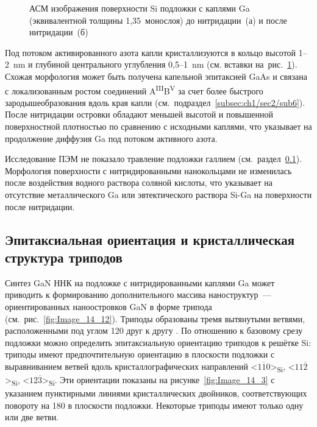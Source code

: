 \begin{figure}[ht] 
				\caption{АСМ изображения поверхности Si подложки с каплями Ga
			(эквивалентной толщины 1,35~монослоя) до нитридации~(а) и после
	нитридации~(б)}\label{fig:Image_13} \end{figure}

Под потоком активированного азота капли кристаллизуются в кольцо высотой
1--2~\si{\nano\meter} и глубиной центрального углубления
0,5--1~\si{\nano\meter} (см. вставки на~рис.~\cref{fig:Image_13}). Схожая
морфология может быть получена капельной эпитаксией GaAs \cite{Zhou2013} и
связана с локализованным ростом соединений
A\textsuperscript{III}B\textsuperscript{V} за счет более быстрого
зародышеобразования вдоль края капли
(см.~подраздел~\cref{subsec:ch1/sec2/sub6}). После нитридации островки обладают
меньшей высотой и повышенной поверхностной плотностью по сравнению с исходными
каплями, что указывает на продолжение диффузия Ga под потоком активного азота.

Исследование ПЭМ не показало травление подложки галлием
(см.~раздел~\cref{subsec:ch3/sec2/sub2}). Морфология поверхности с
нитридированными нанокольцами не изменилась после воздействия водного
раствора соляной кислоты, что указывает на отсутствие металлического Ga или
эвтектического раствора Si-Ga на поверхности после нитридации.

\subsection{Эпитаксиальная ориентация и кристаллическая структура триподов}\label{subsec:ch3/sec2/sub2}

Синтез GaN ННК на подложке с нитридированными каплями Ga может приводить к
формированию дополнительного массива наноструктур~--- ориентированных
наноостровков GaN в форме трипода (см.~рис.~\cref{fig:Image_14_12}). Триподы
образованы тремя вытянутыми ветвями, расположенными под углом 120{\textdegree}
друг к другу \cite{kente2016gallium}. По отношению к базовому срезу подложки можно определить
эпитаксиальную ориентацию триподов к решётке Si: триподы имеют предпочтительную
ориентацию в плоскости подложки с выравниванием ветвей вдоль
кристаллографических направлений <\(1\overline{1}0\)>\textsubscript{Si},
<\(11\overline{2}\)>\textsubscript{Si}, <\(12\overline{3}\)>\textsubscript{Si}.
Эти ориентации показаны на рисунке~\cref{fig:Image_14_3} с указанием
пунктирными линиями кристаллических двойников, соответствующих повороту на
180{\textdegree} в плоскости подложки. Некоторые триподы имеют только одну или
две ветви.

